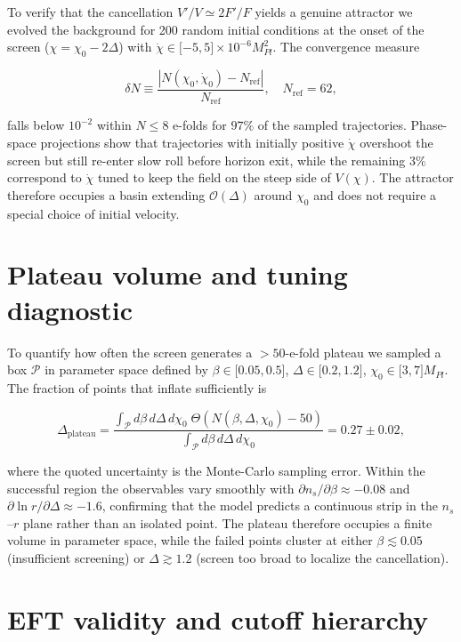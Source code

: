 \documentclass[
]{article}
\begin{document}
To verify that the cancellation \(V'/V \simeq 2F'/F\) yields a genuine
attractor we evolved the background for 200 random initial conditions at
the onset of the screen (\(\chi = \chi_{0} - 2\Delta\)) with
\(\dot{\chi} \in \lbrack - 5,5 \rbrack \times 10^{- 6}M_{Pl}^{2}\). The
convergence measure

\[
\delta N \equiv \frac{|N(\chi_{0},\dot{\chi}_{0}) - N_{\text{ref}}|}{N_{\text{ref}}},\quad N_{\text{ref}} = 62,
\]

falls below \(10^{- 2}\) within \(N \leq 8\) e-folds for \(97\%\) of the
sampled trajectories. Phase-space projections show that trajectories
with initially positive \(\dot{\chi}\) overshoot the screen but still
re-enter slow roll before horizon exit, while the remaining \(3\%\)
correspond to \(\dot{\chi}\) tuned to keep the field on the steep side
of \(V(\chi)\). The attractor therefore occupies a basin extending
\(\mathcal{O}(\Delta)\) around \(\chi_{0}\) and does not require a
special choice of initial velocity.

\section{Plateau volume and tuning
diagnostic}\label{plateau-volume-and-tuning-diagnostic}

To quantify how often the screen generates a \(>50\)-e-fold plateau we
sampled a box \(\mathcal{P}\) in parameter space defined by
\(\beta \in \lbrack 0.05,0.5 \rbrack\),
\(\Delta \in \lbrack 0.2,1.2 \rbrack\),
\(\chi_{0} \in \lbrack 3,7 \rbrack M_{Pl}\). The fraction of points that
inflate sufficiently is

\[
\Delta_{\text{plateau}} = \frac{\int_{\mathcal{P}} d\beta\, d\Delta\, d\chi_{0}\; \Theta(N(\beta,\Delta,\chi_{0}) - 50)}{\int_{\mathcal{P}} d\beta\, d\Delta\, d\chi_{0}} = 0.27 \pm 0.02,
\]

where the quoted uncertainty is the Monte-Carlo sampling error. Within
the successful region the observables vary smoothly with
\(\partial n_{s}/\partial \beta \approx -0.08\) and
\(\partial \ln r /\partial \Delta \approx -1.6\), confirming that the
model predicts a continuous strip in the \(n_{s}\)--\(r\) plane rather
than an isolated point. The plateau therefore occupies a finite volume
in parameter space, while the failed points cluster at either
\(\beta \lesssim 0.05\) (insufficient screening) or
\(\Delta \gtrsim 1.2\) (screen too broad to localize the cancellation).

\section{EFT validity and cutoff
hierarchy}\label{eft-validity-and-cutoff-hierarchy}
\end{document}
